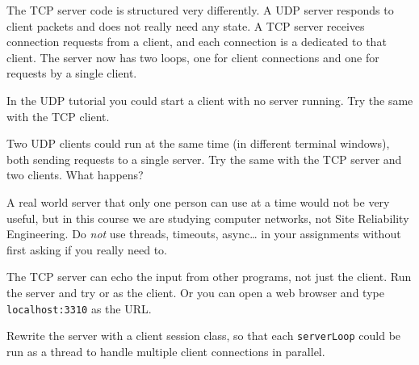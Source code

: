 The TCP server code is structured very differently. A UDP server responds
to client packets and does not really need any state. A TCP server receives
connection requests from a client, and each connection is a 
dedicated to that client. The server now has two loops, one for client connections
and one for requests by a single client.



In the UDP tutorial you could start a client with no server running. Try the
same with the TCP client.

Two UDP clients could run at the same time (in different terminal windows),
both sending requests to a single server. Try the same with the TCP server
and two clients. What happens?

\begin{IMPORTANT}
A real world server that only one person can use at a time would not be very
useful, but in this course we are studying computer networks, not Site
Reliability Engineering. Do \emph{not} use threads, timeouts, async\ldots
in your assignments without first asking if you really need to.
\end{IMPORTANT}




The TCP server can echo the input from other programs, not just the client.
Run the server and try  or  as the client. Or you can open
a web browser and type \texttt{localhost:3310} as the URL.

Rewrite the server with a client session class, so that each \texttt{serverLoop}
could be run as a thread to handle multiple client connections in parallel.

\COPYRIGHT


